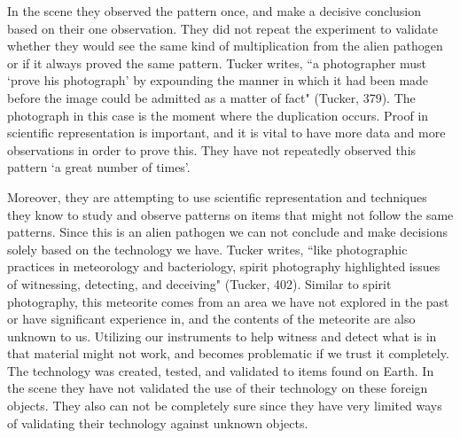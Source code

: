 \documentclass[11pt, oneside]{article}
\begin{document}

\par In the scene they observed the pattern once, and make a decisive conclusion based on their one observation. They did not repeat the experiment to validate whether they would see the same kind of multiplication from the alien pathogen or if it always proved the same pattern. Tucker writes, ``a photographer must `prove his photograph' by expounding the manner in which it had been made before the image could be admitted as a matter of fact" (Tucker, 379). The photograph in this case is the moment where the duplication occurs. Proof in scientific representation is important, and it is vital to have more data and more observations in order to prove this. They have not repeatedly observed this pattern `a great number of times'.


\par Moreover, they are attempting to use scientific representation and techniques they know to study and observe patterns on items that might not follow the same patterns. Since this is an alien pathogen we can not conclude and make decisions solely based on the technology we have. Tucker writes, ``like photographic practices in meteorology and bacteriology, spirit photography highlighted issues of witnessing, detecting, and deceiving" (Tucker, 402). Similar to spirit photography, this meteorite comes from an area we have not explored in the past or have significant experience in, and the contents of the meteorite are also unknown to us. Utilizing our instruments to help witness and detect what is in that material might not work, and becomes problematic if we trust it completely. The technology was created, tested, and validated to items found on Earth. In the scene they have not validated the use of their technology on these foreign objects. They also can not be completely sure since they have very limited ways of validating their technology against unknown objects.

\end{document}
